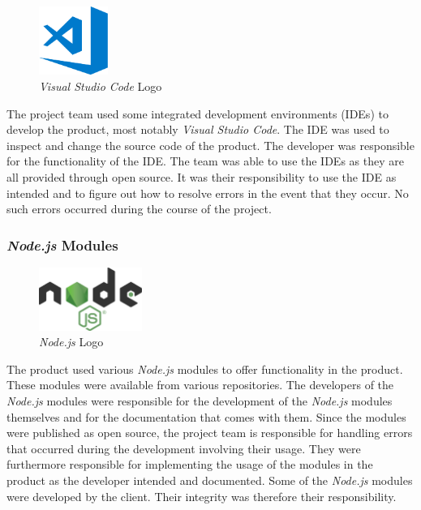 \begin{figure}[H]
    \begin{center}
        \includegraphics[width=0.2\textwidth]{images/logos/visual-studio-code-logo.png}
        \caption{\textit{Visual Studio Code} Logo}
        \label{fig:visual-studio-code_logo}
    \end{center}
\end{figure}

The project team used some integrated development environments (IDEs) to develop the product, most notably \textit{Visual Studio Code}. The IDE was used to inspect and change the source code of the product.
\newline
The developer was responsible for the functionality of the IDE. The team was able to use the IDEs as they are all provided through open source. It was their responsibility to use the IDE as intended and to figure out how to resolve errors in the event that they occur. No such errors occurred during the course of the project.

\subsubsection{\textit{Node.js} Modules}
\label{sssec:nodejs_modules}

\begin{figure}[H]
    \begin{center}
        \includegraphics[width=0.3\textwidth]{images/logos/node-js-logo.png}
        \caption{\textit{Node.js} Logo}
        \label{fig:node-js-logo}
    \end{center}
\end{figure}

The product used various \textit{Node.js} modules to offer functionality in the product. These modules were available from various repositories.
\newline
The developers of the \textit{Node.js} modules were responsible for the development of the \textit{Node.js} modules themselves and for the documentation that comes with them. Since the modules were published as open source, the project team is responsible for handling errors that occurred during the development involving their usage. They were furthermore responsible for implementing the usage of the modules in the product as the developer intended and documented.
\newline
Some of the \textit{Node.js} modules were developed by the client. Their integrity was therefore their responsibility.

